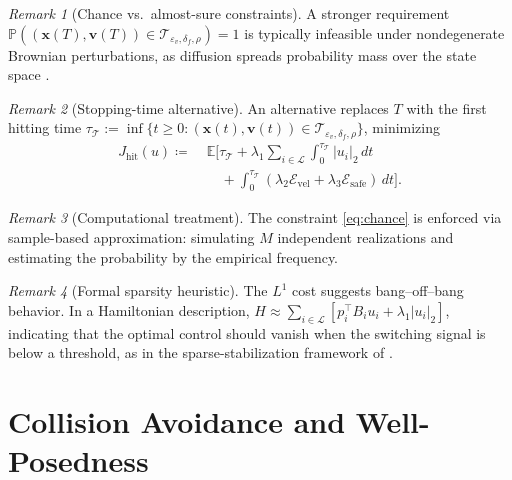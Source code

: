 \documentclass[pdflatex,sn-mathphys-num]{sn-jnl}%
\numberwithin{equation}{section}
\theoremstyle{thmstyleone}%
\theoremstyle{remark}
\newtheorem{remark}{Remark}
\theoremstyle{definition}
\newcommand{\E}{\mathbb{E}}
\newcommand{\Prob}{\mathbb{P}}
\newcommand{\calL}{\mathcal{L}}
\newcommand{\calT}{\mathcal{T}}
\newcommand{\calE}{\mathcal{E}}
\begin{document}
\begin{remark}[Chance vs.\ almost-sure constraints]\label{rem:as-infeasible}
A stronger requirement
$\Prob( (\mathbf{x}(T),\mathbf{v}(T))\in\calT_{\varepsilon_v,\delta_f,\rho} )=1$ is
typically infeasible under nondegenerate Brownian perturbations, as
diffusion spreads probability mass over the state space
\cite{banerjea1998stochastic,nemirovski2007convex}.
\end{remark}
\begin{remark}[Stopping-time alternative]\label{rem:stopping}
An alternative replaces $T$ with the first hitting time
$\tau_{\calT} := \inf\{ t\ge 0: (\mathbf{x}(t),\mathbf{v}(t))\in\calT_{\varepsilon_v,\delta_f,\rho} \}$,
minimizing
\begin{equation*}
\begin{aligned}
  J_{\mathrm{hit}}(u) \coloneqq\;&
  \E\biggl[ \tau_{\calT}
    + \lambda_1\sum_{i\in\calL}\int_0^{\tau_{\calT}} |u_i|_2\,dt \\
  &\quad + \int_0^{\tau_{\calT}} (\lambda_2\calE_{\mathrm{vel}}
    + \lambda_3\calE_{\mathrm{safe}})\,dt \biggr].
\end{aligned}
\end{equation*}
\end{remark}
\begin{remark}[Computational treatment]\label{rem:computational-chance}
The constraint \eqref{eq:chance} is enforced via sample-based approximation:
simulating $M$ independent realizations and estimating the probability by
the empirical frequency.
\end{remark}
\begin{remark}[Formal sparsity heuristic]\label{rem:heuristic}
The $L^1$ cost suggests bang--off--bang behavior. In a Hamiltonian
description,
$H \approx \sum_{i\in\calL} [ p_i^\top B_i u_i + \lambda_1 |u_i|_2 ]$,
indicating that the optimal control should vanish when the switching signal
is below a threshold, as in the sparse-stabilization framework of
\cite{caponigro2013sparse,caponigro2015sparse,bongini2017mean}.
\end{remark}

\section{Collision Avoidance and Well-Posedness}
\label{sec:collision}
\end{document}
